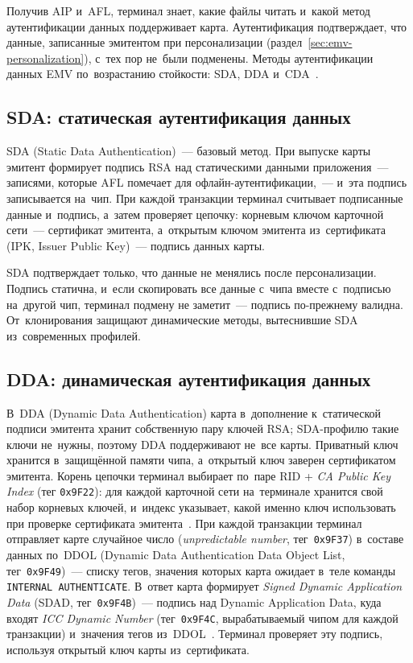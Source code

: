 Получив AIP и~AFL, терминал знает, какие файлы читать и~какой метод
аутентификации данных поддерживает карта. Аутентификация подтверждает, что
данные, записанные эмитентом при персонализации
(раздел~\ref{sec:emv-personalization}), с~тех пор не~были подменены. Методы
аутентификации данных EMV по~возрастанию стойкости: SDA, DDA
и~CDA~\cite{emvco-book2}.

\subsection*{SDA: статическая аутентификация данных}

SDA (Static Data Authentication)~--- базовый метод. При выпуске карты эмитент
формирует подпись RSA над статическими данными приложения~--- записями, которые
AFL помечает для офлайн-аутентификации,~--- и~эта подпись записывается на~чип.
При каждой транзакции терминал считывает подписанные данные и~подпись, а~затем
проверяет цепочку: корневым ключом карточной сети~--- сертификат эмитента,
а~открытым ключом эмитента из~сертификата (IPK, Issuer Public Key)~--- подпись
данных карты.

SDA подтверждает только, что данные не менялись после персонализации. Подпись
статична, и~если скопировать все данные с~чипа вместе с~подписью на~другой чип,
терминал подмену не заметит~--- подпись по-прежнему валидна. От~клонирования
защищают динамические методы, вытеснившие SDA из~современных профилей.

\subsection*{DDA: динамическая аутентификация данных}

В~DDA (Dynamic Data Authentication) карта в~дополнение к~статической подписи
эмитента хранит собственную пару ключей RSA; SDA-профилю такие ключи не~нужны,
поэтому DDA поддерживают не~все карты. Приватный ключ хранится в~защищённой памяти чипа, а~открытый ключ заверен
сертификатом эмитента. Корень цепочки терминал выбирает по~паре RID + \emph{CA
Public Key Index} (тег \texttt{0x9F22}): для каждой карточной сети на~терминале
хранится свой набор корневых ключей, и~индекс указывает, какой именно ключ
использовать при проверке сертификата эмитента~\cite{emv-tag-9F22}. При каждой
транзакции терминал отправляет карте случайное число (\textit{unpredictable
number}, тег~\texttt{0x9F37}) в~составе данных по~DDOL (Dynamic Data
Authentication Data Object List, тег~\texttt{0x9F49})~--- списку тегов,
значения которых карта ожидает в~теле команды \texttt{INTERNAL AUTHENTICATE}. В~ответ карта формирует
\emph{Signed Dynamic Application Data} (SDAD, тег~\texttt{0x9F4B})~--- подпись над
Dynamic Application Data, куда входят \emph{ICC Dynamic Number}
(тег~\texttt{0x9F4C}, вырабатываемый чипом для каждой транзакции) и~значения
тегов из~DDOL~\cite{emv-tag-9F4C}. Терминал проверяет эту подпись, используя
открытый ключ карты из~сертификата.

